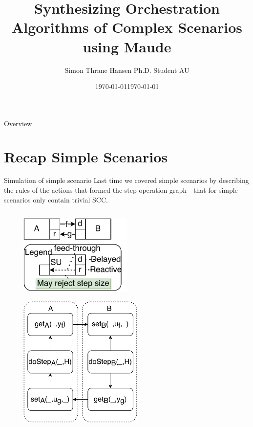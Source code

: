 \documentclass{beamer}
\title[Synthesizing Co-Simulation Algorithms] %
{Synthesizing Orchestration Algorithms of Complex Scenarios using Maude}
\date{\today}
\author[Thrane, S.] %
{Simon Thrane Hansen \newline Ph.D. Student AU}
\date[AU 2021] %
{\today}
\begin{document}
\frame{\titlepage}

\begin{frame}{Overview}
    \tableofcontents
\end{frame}

\section{Recap Simple Scenarios}
\begin{frame}{Simulation of simple scenario}
    Last time we covered simple scenarios by describing the rules of the actions that formed the step operation graph - that for simple scenarios only contain trivial SCC.
    \begin{columns}[T] %
        \begin{column}{.48\textwidth}
            \begin{figure}    
                \includegraphics[width=0.5\textwidth]{images/simple_example.pdf}
            \end{figure}
            \begin{figure}
                \centering
                \includegraphics[width=0.55\textwidth]{images/simple_scenario_graph.pdf}
            \end{figure}
    \end{column}%

\end{columns}
\end{frame}
\end{document}
